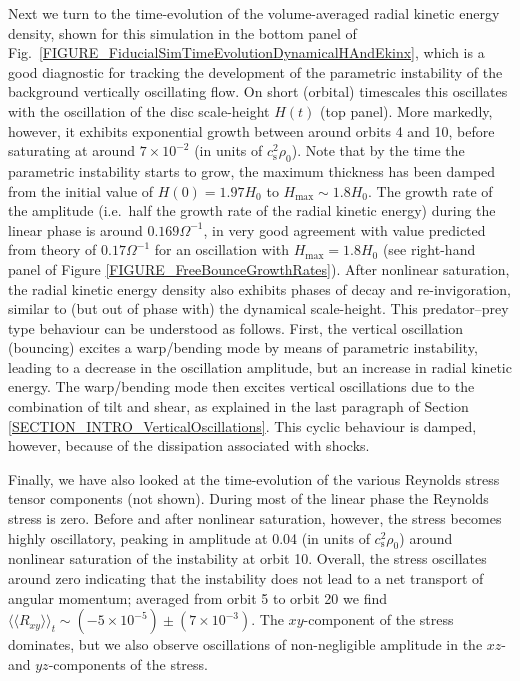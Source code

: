 \documentclass[fleqn,usenatbib]{mnras}
\begin{document}
Next we turn to the time-evolution of the volume-averaged radial kinetic energy density, shown for this simulation in the bottom panel of Fig.~\ref{FIGURE_FiducialSimTimeEvolutionDynamicalHAndEkinx}, which is a good diagnostic for tracking the development of the parametric instability of the background vertically oscillating flow. On short (orbital) timescales this oscillates with the oscillation of the disc scale-height $H(t)$ (top panel). More markedly, however, it exhibits exponential growth between around orbits 4 and 10, before saturating at around $7\times10^{-2}$ (in units of $c_\text{s}^2 \rho_0$). Note that by the time the parametric instability starts to grow, the maximum thickness has been damped from the initial value of $H(0) = 1.97H_0$ to $H_\text{max} \sim 1.8H_0$. The growth rate of the amplitude (i.e.\ half the growth rate of the radial kinetic energy) during the linear phase is around $0.169\Omega^{-1}$, in very good agreement with value predicted from theory of $0.17\Omega^{-1}$ for an oscillation with $H _\text{max}= 1.8H_0$ (see right-hand panel of Figure \ref{FIGURE_FreeBounceGrowthRates}). After nonlinear saturation, the radial kinetic energy density also exhibits phases of decay and re-invigoration, similar to (but out of phase with) the dynamical scale-height. This predator--prey type behaviour can be understood as follows. First, the vertical oscillation (bouncing) excites a warp/bending mode by means of parametric instability, leading to a decrease in the oscillation amplitude, but an increase in radial kinetic energy. The warp/bending mode then excites vertical oscillations due to the combination of tilt and shear, as explained in the last paragraph of Section \ref{SECTION_INTRO_VerticalOscillations}. This cyclic behaviour is damped, however, because of the dissipation associated with shocks.

Finally, we have also looked at the time-evolution of the various Reynolds stress tensor components (not shown). During most of the linear phase the Reynolds stress is zero. Before and after nonlinear saturation, however, the stress becomes highly oscillatory, peaking in amplitude at 0.04 (in units of $c_\text{s}^2 \rho_0$) around nonlinear saturation of the instability at orbit 10. Overall, the stress oscillates around zero indicating that the instability does not lead to a net transport of angular momentum; averaged from orbit 5 to orbit 20 we find $\langle \langle R_{xy} \rangle \rangle_t \sim (-5\times 10^{-5}) \pm (7\times10^{-3})$. The $xy$-component of the stress dominates, but we also observe oscillations of non-negligible amplitude in the $xz$- and $yz$-components of the stress.
\end{document}
